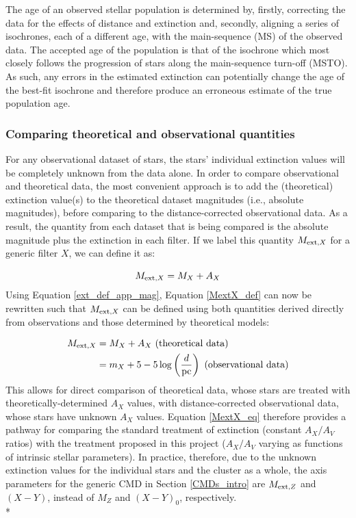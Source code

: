 \documentclass[12pt, a4paper]{report}
\begin{document}
The age of an observed stellar population is determined by, firstly, correcting the data for the effects of distance and extinction and, secondly, aligning a series of isochrones, each of a different age, with the main-sequence (MS) of the observed data. The accepted age of the population is that of the isochrone which most closely follows the progression of stars along the main-sequence turn-off (MSTO). As such, any errors in the estimated extinction can potentially change the age of the best-fit isochrone and therefore produce an erroneous estimate of the true population age.

\subsubsection{Comparing theoretical and observational quantities} \label{add_ext}
For any observational dataset of stars, the stars' individual extinction values will be completely unknown from the data alone. In order to compare observational and theoretical data, the most convenient approach is to add the (theoretical) extinction value(s) to the theoretical dataset magnitudes (i.e., absolute magnitudes), before comparing to the distance-corrected observational data. As a result, the quantity from each dataset that is being compared is the absolute magnitude plus the extinction in each filter. If we label this quantity $M_{\textnormal{ext},X}$ for a generic filter $X$, we can define it as:

\begin{equation}
M_{\textnormal{ext},X} = M_{X} + A_{X}
\label{MextX_def}
\end{equation}
Using Equation \ref{ext_def_app_mag}, Equation \ref{MextX_def} can now be rewritten such that $M_{\textnormal{ext},X}$ can be defined using both quantities derived directly from observations and those determined by theoretical models:

\begin{align}
\begin{split}
M_{\textnormal{ext},X} &= M_{X} + A_{X} \textnormal{ (theoretical data)}\\
 &= m_{X} + 5 - 5\log\left(\frac{d}{\textnormal{pc}}\right) \textnormal{ (observational data)}
\end{split}
\label{MextX_eq}
\end{align}
This allows for direct comparison of theoretical data, whose stars are treated with theoretically-determined $A_{X}$ values, with distance-corrected observational data, whose stars have unknown $A_{X}$ values. Equation \ref{MextX_eq} therefore provides a pathway for comparing the standard treatment of extinction (constant $A_{X}/A_{V}$ ratios) with the treatment proposed in this project ($A_{X}/A_{V}$ varying as functions of intrinsic stellar parameters). In practice, therefore, due to the unknown extinction values for the individual stars and the cluster as a whole, the axis parameters for the generic CMD in Section \ref{CMDs_intro} are $M_{\textnormal{ext},Z}$ and $(X-Y)$, instead of $M_{Z}$ and $(X-Y)_{0}$, respectively.\\*
\end{document}
